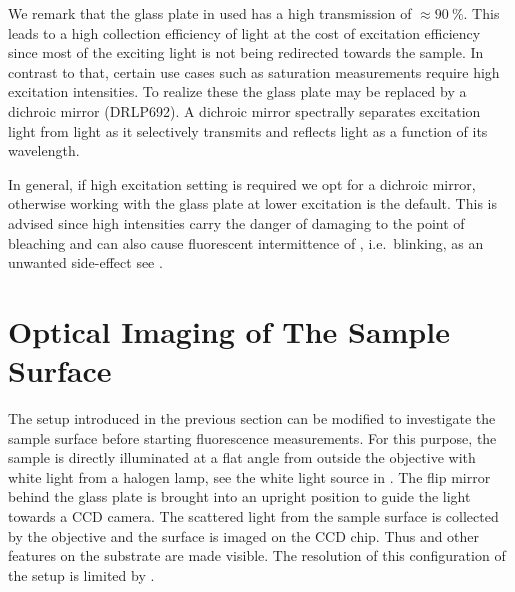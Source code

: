 		We remark that the glass plate in used  has a high transmission of $\approx \SI{90}{\percent}$. This leads to a high collection efficiency of \fl light at the cost of excitation efficiency since most of the exciting light is not being redirected towards the sample. In contrast to that, certain use cases such as saturation measurements require high excitation intensities. To realize these the glass plate may be replaced by a dichroic mirror (DRLP692). A dichroic mirror spectrally separates excitation light from \pl light as it selectively transmits and reflects light as a function of its wavelength.

		In general, if high excitation setting is required we opt for a dichroic mirror, otherwise working with the glass plate at lower excitation is the default. This is advised since high intensities carry the danger of damaging \sivs to the point of bleaching and can also cause fluorescent intermittence of \sivs, i.e.\ blinking, as an unwanted side-effect see .

	\section[Surface Imaging]{Optical Imaging of The Sample Surface} \label{sec::methods_optical}

		The setup introduced in the previous section can be modified to investigate the sample surface before starting fluorescence measurements.
		For this purpose, the sample is directly illuminated at a flat angle from outside the objective with white light from a halogen lamp, see the white light source in .
		The flip mirror behind the glass plate is brought into an upright position to guide the light towards a CCD camera.
		The scattered light from the sample surface is collected by the objective and the surface is imaged on the CCD chip.
		Thus \nds and other features on the substrate are made visible.
		The resolution of this configuration of the setup is limited by .

